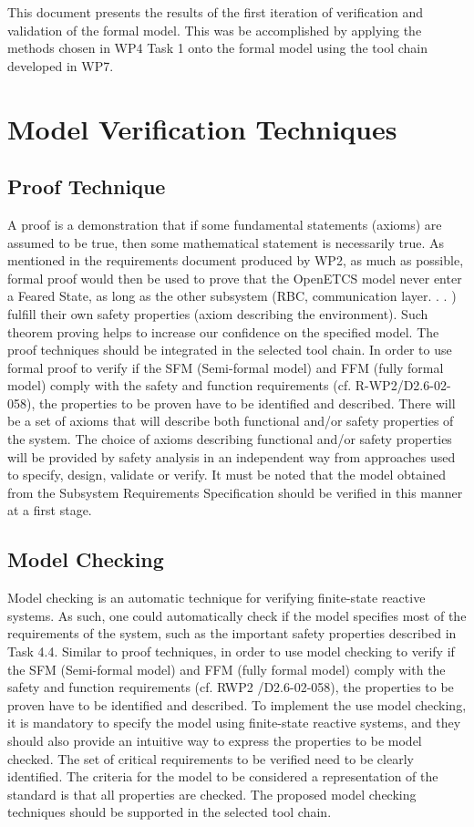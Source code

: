 \documentclass{template/openetcs_article}
\begin{document}
This document presents the results of the first iteration of verification and validation of the formal model. This was be accomplished
by applying the methods chosen in WP4 Task 1 onto the formal model using the tool
chain developed in WP7. 

\section{Model Verification Techniques}

\subsection{Proof Technique}

A proof is a demonstration that if some fundamental statements (axioms) are assumed to be
true, then some mathematical statement is necessarily true. As mentioned in the requirements
document produced by WP2, as much as possible, formal proof would then be used to prove
that the OpenETCS model never enter a Feared State, as long as the other subsystem (RBC,
communication layer. . . ) fulfill their own safety properties (axiom describing the environment).
Such theorem proving helps to increase our confidence on the specified model. The proof
techniques should be integrated in the selected tool chain.
In order to use formal proof to verify if the SFM (Semi-formal model) and FFM (fully formal
model) comply with the safety and function requirements (cf. R-WP2/D2.6-02-058), the properties
to be proven have to be identified and described. There will be a set of axioms that will
describe both functional and/or safety properties of the system. The choice of axioms describing
functional and/or safety properties will be provided by safety analysis in an independent way
from approaches used to specify, design, validate or verify. It must be noted that the model
obtained from the Subsystem Requirements Specification should be verified in this manner at a
first stage.

\subsection{Model Checking}

Model checking is an automatic technique for verifying finite-state reactive systems. As such,
one could automatically check if the model specifies most of the requirements of the system,
such as the important safety properties described in Task 4.4.
Similar to proof techniques, in order to use model checking to verify if the SFM (Semi-formal
model) and FFM (fully formal model) comply with the safety and function requirements (cf. RWP2
/D2.6-02-058), the properties to be proven have to be identified and described. To implement the use model checking, it is mandatory to specify the model using finite-state reactive systems,
and they should also provide an intuitive way to express the properties to be model checked. The
set of critical requirements to be verified need to be clearly identified. The criteria for the model
to be considered a representation of the standard is that all properties are checked. The proposed
model checking techniques should be supported in the selected tool chain.
\end{document}
